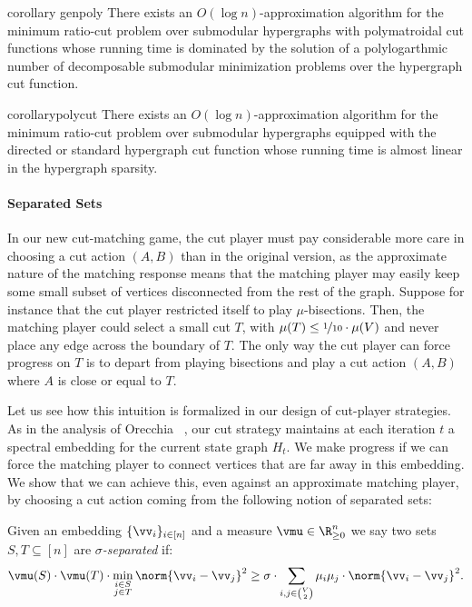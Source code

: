 \documentclass[letterpaper]{article}
\begin{document}
\begin{restatable}{corollary} {genpoly}
\label{thm.cm.approx-logn}
There exists an $O(\log n)$-approximation algorithm for the minimum ratio-cut problem over submodular hypergraphs with polymatroidal cut functions whose running time is dominated by the solution of a polylogarthmic number of decomposable submodular minimization problems over the hypergraph cut function.
\end{restatable}

\begin{restatable}{corollary}{polycut}
There exists an $O(\log n)$-approximation algorithm for the minimum ratio-cut problem over submodular hypergraphs equipped with the directed or standard hypergraph cut function whose running time is almost linear in the hypergraph sparsity.
\end{restatable}

\paragraph{Separated Sets}
In our new cut-matching game, the cut player must pay considerable more care in choosing a cut action $(A, B)$ than in the original version, as the approximate nature of the matching response means that the matching player may easily keep some small subset of vertices disconnected from the rest of the graph. Suppose for instance that the cut player restricted itself to play $\mu$-bisections. Then, the matching player could select a small cut $T$, with $\mu(T) \leq \nicefrac{1}{10} \cdot \mu(V)$ and never place any edge across the boundary of $T.$ The only way the cut player can force progress on $T$ is to depart from playing bisections and play a cut action $(A,B)$ where $A$ is close or equal to $T.$

Let us see how this intuition is formalized in our design of cut-player strategies. As in the analysis of Orecchia \etal~\cite{orecchiaPartitioningGraphsSingle2008}, our cut strategy maintains at each iteration $t$ a spectral embedding for the current state graph $H_t$. We make progress if we can force the matching player to connect vertices that are far away in this embedding. We show that we can achieve this, even against an approximate matching player, by choosing a cut action coming from the following notion of separated sets:
\begin{definition}
\label{def.separated-sets}
    Given an embedding $\{\vv_i\}_{i\in [n]}$ and a measure $\vmu \in \R^n_{\geq 0}$ we say two sets $S, T \subseteq [n]$ are \emph{$\sigma$-separated} if:
    \[
        \vmu(S) \cdot \vmu(T) \cdot \min_{\substack{i\in S\\ j\in T}} \norm{\vv_i - \vv_j}^2 \geq \sigma \cdot \sum_{i,j \in \binom{V}{2}} \mu_i \mu_j \cdot \norm{\vv_i - \vv_j}^2.
    \]
\end{definition}
\end{document}
